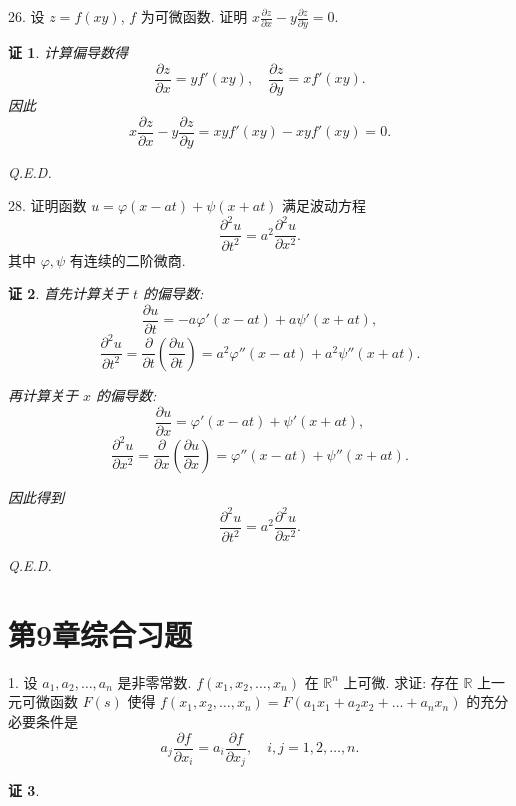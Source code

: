 \documentclass[a4paper,12pt]{article}
\newtheorem*{pf}{证}
\begin{document}
26. 设 $z = f(xy)$, $f$ 为可微函数. 证明 $x\frac{\partial z}{\partial x} - y\frac{\partial z}{\partial y} = 0$.
\begin{pf}
    计算偏导数得
    $$
        \frac{\partial z}{\partial x} = y f'(xy), \quad
        \frac{\partial z}{\partial y} = x f'(xy).
    $$
    因此
    $$
        x\frac{\partial z}{\partial x} - y\frac{\partial z}{\partial y}
        = xy f'(xy) - xy f'(xy)
        = 0.
    $$

    Q.E.D.
\end{pf}


28. 证明函数 $u = \varphi(x - at) + \psi(x + at)$ 满足波动方程
$$
    \frac{\partial^2 u}{\partial t^2} = a^2 \frac{\partial^2 u}{\partial x^2}.
$$
其中 $\varphi, \psi$ 有连续的二阶微商.
\begin{pf}
    首先计算关于 $t$ 的偏导数:
    $$
        \frac{\partial u}{\partial t} = -a \varphi'(x - at) + a \psi'(x + at),
    $$
    $$
        \frac{\partial^2 u}{\partial t^2}
        = \frac{\partial}{\partial t} \left( \frac{\partial u}{\partial t} \right)
        = a^2 \varphi''(x - at) + a^2 \psi''(x + at).
    $$

    再计算关于 $x$ 的偏导数:
    $$
        \frac{\partial u}{\partial x} = \varphi'(x - at) + \psi'(x + at),
    $$
    $$
        \frac{\partial^2 u}{\partial x^2}
        = \frac{\partial}{\partial x} \left( \frac{\partial u}{\partial x} \right)
        = \varphi''(x - at) + \psi''(x + at).
    $$

    因此得到
    $$
        \frac{\partial^2 u}{\partial t^2} = a^2 \frac{\partial^2 u}{\partial x^2}.
    $$

    Q.E.D.
\end{pf}

\section*{第9章综合习题}

1. 设 $a_1,a_2,\dots,a_n$ 是非零常数. $f(x_1,x_2,\dots,x_n)$ 在 $\mathbb{R}^n$ 上可微. 求证: 存在 $\mathbb{R}$ 上一元可微函数 $F(s)$ 使得 $f(x_1,x_2,\dots,x_n) = F(a_1x_1 + a_2x_2 + \dots + a_nx_n)$ 的充分必要条件是
$$
    a_j\frac{\partial f}{\partial x_i} = a_i\frac{\partial f}{\partial x_j},\quad i,j = 1,2,\dots,n.
$$
\begin{pf}

\end{pf}
\end{document}
